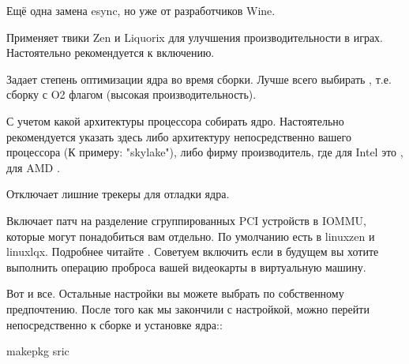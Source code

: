 \documentclass[letterpaper,10pt,russian,openany]{sphinxmanual}
\begin{document}
\sphinxAtStartPar
{} \sphinxhyphen{} Ещё одна замена esync, но уже от разработчиков Wine.

\sphinxAtStartPar
{} \sphinxhyphen{} Применяет твики Zen и Liquorix для улучшения производительности в играх.
Настоятельно рекомендуется к включению.

\sphinxAtStartPar
{} \sphinxhyphen{} Задает степень оптимизации ядра во время сборки.
Лучше всего выбирать , т.е. сборку с \sphinxhyphen{}O2 флагом (высокая производительность).

\sphinxAtStartPar
{} \sphinxhyphen{} С учетом какой архитектуры процессора собирать ядро.
Настоятельно рекомендуется указать здесь либо архитектуру непосредственно вашего процессора (К примеру: "skylake"),
либо фирму производитель, где для Intel это \sphinxhyphen{} , для AMD \sphinxhyphen{} .

\sphinxAtStartPar
{} \sphinxhyphen{} Отключает лишние трекеры для отладки ядра.

\sphinxAtStartPar
{} \sphinxhyphen{} Включает патч на разделение сгруппированных PCI устройств в IOMMU, которые могут понадобиться вам отдельно.
По умолчанию есть в linux\sphinxhyphen{}zen и linux\sphinxhyphen{}lqx.
Подробнее читайте \sphinxhyphen{} .
Советуем включить если в будущем вы хотите выполнить операцию проброса вашей видеокарты в виртуальную машину.

\sphinxAtStartPar
Вот и все. Остальные настройки  вы можете выбрать по собственному предпочтению.
После того как мы закончили с настройкой, можно перейти непосредственно к сборке и установке ядра::

\begin{sphinxVerbatim}[commandchars=\\\{\}]
makepkg \PYGZhy{}sric 
\end{sphinxVerbatim}

\ignorespaces 
\end{document}
